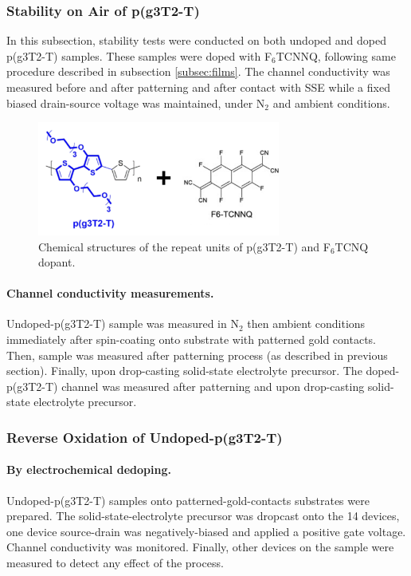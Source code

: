 \subsubsection{Stability on Air of p(g3T2-T)}
In this subsection, stability tests were conducted on both undoped and doped p(g3T2-T) samples. These samples were doped with F$_{6}$TCNNQ, following same procedure described in subsection \ref{subsec:films}. The channel conductivity was measured %
before and after patterning and after contact with SSE %
while a fixed biased drain-source voltage was maintained, under N$_{2}$ and ambient conditions. %

\begin{figure}[ht]
  \centering
  \includegraphics[width=8cm]{Images/pdf/doping_formulas2.pdf}
  \caption{Chemical structures of the repeat units of p(g3T2-T) and F$_{6}$TCNQ dopant.}
  \label{fig:dop2}
\end{figure}

\paragraph{Channel conductivity measurements.}Undoped-p(g3T2-T) sample was measured in N$_{2}$ then ambient conditions immediately after spin-coating onto substrate with patterned gold contacts. Then, sample was measured after patterning process (as described in previous section). Finally, upon drop-casting solid-state electrolyte precursor. The doped-p(g3T2-T) channel was measured after patterning and upon drop-casting solid-state electrolyte precursor.

\subsubsection{Reverse Oxidation of Undoped-p(g3T2-T)}

\paragraph{By electrochemical dedoping.}Undoped-p(g3T2-T) samples onto patterned-gold-contacts substrates were prepared. The solid-state-electrolyte precursor was dropcast onto the 14 devices, one device source-drain was negatively-biased and applied a positive gate voltage. Channel conductivity was monitored. Finally, other devices on the sample were measured to detect any effect of the process.


